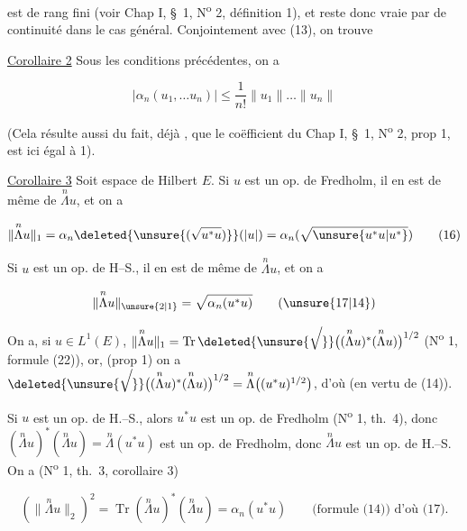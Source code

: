 est de rang fini  (voir Chap I, \S~1, N\textsuperscript{o} 2, définition 1), et reste donc vraie par  de continuité dans le cas général. Conjointement avec (13), on trouve

\uline{Corollaire 2} Sous les conditions précédentes, on a

\[
|\alpha_n(u_1,\ldots u_n)|\leq\frac1{n!}\lVert u_1\rVert\ldots\lVert u_n\rVert\tag*{(15)}
\]

(Cela résulte aussi du fait, déjà , que le coëfficient  du Chap I, \S~1, N\textsuperscript{o} 2, prop 1, est ici égal à 1).

\uline{Corollaire 3} Soit   espace de Hilbert $E$.  Si $u$ est un op. de Fredholm, il en est de même de $\overset{n}{\Lambda}u$, et on a

\[
\lVert\overset{n}{\Lambda}u\rVert_1=\alpha_n\deleted{\unsure{(\sqrt{u^*u})}}(|u|)=\alpha_n(\sqrt{\unsure{u^*u|u^*}})
\tag*{(16)}
\]

Si $u$ est un op. de H--S., il en est de même de $\overset{n}{\Lambda}u$, et on a

\[
\lVert\overset{n}{\Lambda}u\rVert_{\unsure{2|1}}=\sqrt{\alpha_n(u^*u)}\tag*{(\unsure{17|14})}
\]

On a, si $u\in L^1(E)$, $\lVert\overset{n}{\Lambda}u\rVert_1=\operatorname{Tr}\deleted{\unsure{\sqrt{\vphantom{(\overset{n}{\Lambda}u)^*}}}}\bigl((\overset{n}{\Lambda}u)^*(\overset{n}{\Lambda}u)\bigr)^{1/2}$ (N\textsuperscript{o} 1, formule (22)), or, (prop 1) on a $\deleted{\unsure{\sqrt{\vphantom{(\overset{n}{\Lambda}u)^*}}}}\bigl((\overset{n}{\Lambda}u)^*(\overset{n}{\Lambda}u)\bigr)^{1/2}=\overset{n}{\Lambda}\bigl((u^*u)^{1/2}\bigr)$, d'où   (en vertu de (14)).


Si $u$ est un op. de H.--S., alors $u^*u$ est un op. de Fredholm (N\textsuperscript{o} 1, th.~4), donc $(\overset{n}{\Lambda}u)^*(\overset{n}{\Lambda}u)=\overset{n}{\Lambda}(u^*u)$ est un op. de Fredholm,  donc $\overset{n}{\Lambda}u$ est un op. de H.--S. On a (N\textsuperscript{o} 1, th.~3, corollaire 3)

\[
(\lVert\overset{n}{\Lambda}u\rVert_2)^2=\operatorname{Tr}(\overset{n}{\Lambda}u)^*(\overset{n}{\Lambda}u)=\alpha_n(u^*u)\qquad\text{(formule (14)) d'où (17)}.
\]
